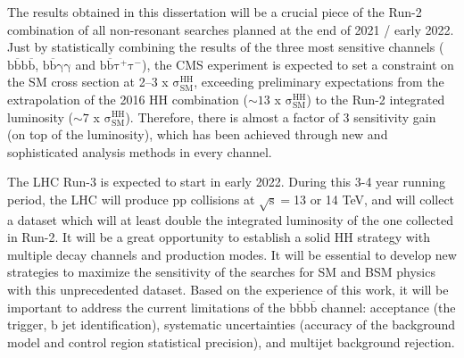 The results obtained in this dissertation will be a crucial piece of the Run-2 combination of all non-resonant searches planned at the end of 2021 / early 2022. Just by statistically combining the results of the three most sensitive channels ($\mathrm{b\overline{b}b\overline{b}}$, $\mathrm{b\overline{b}\gamma\gamma}$ and $\mathrm{b\overline{b}\tau^{+}\tau^{-}}$), the CMS experiment is expected to set a constraint on the SM cross section at 2--3 x $\mathrm{\sigma_{SM}^{HH}}$, exceeding preliminary expectations from the extrapolation of the 2016 HH combination ($\sim13$ x $\mathrm{\sigma_{SM}^{HH}}$) to the Run-2 integrated luminosity ($\sim7$ x $\mathrm{\sigma_{SM}^{HH}}$). Therefore, there is almost a factor of 3 sensitivity gain (on top of the luminosity), which has been achieved through new and sophisticated analysis methods in every channel.

The LHC Run-3 is expected to start in early 2022. During this 3-4 year running period, the LHC will produce pp collisions at $\mathrm{\sqrt{s}=}$13 or 14 TeV, and will collect a dataset which will at least double the integrated luminosity of the one collected in Run-2. It will be a great opportunity to establish a solid HH strategy with multiple decay channels and production modes. It will be essential to develop new strategies to maximize the sensitivity of the searches for SM and BSM physics with this unprecedented dataset. Based on the experience of this work, it will be important to address the current limitations of the $\mathrm{b\overline{b}b\overline{b}}$ channel: acceptance (the trigger, b jet identification), systematic uncertainties (accuracy of the background model and control region statistical precision), and multijet background rejection.


